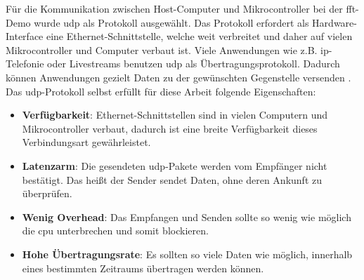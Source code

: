\documentclass[../EDF Master Thesis.tex]{subfiles}
\begin{document}
    Für die Kommunikation zwischen Host-Computer und Mikrocontroller bei der \ac{fft}-Demo wurde \ac{udp} als Protokoll ausgewählt.
    Das Protokoll erfordert als Hardware-Interface eine Ethernet-Schnittstelle, welche weit verbreitet und daher auf vielen Mikrocontroller und Computer verbaut ist.
    Viele Anwendungen wie z.B. \ac{ip}-Telefonie oder Livestreams benutzen \ac{udp} als Übertragungsprotokoll.
    Dadurch können Anwendungen gezielt Daten zu der gewünschten Gegenstelle versenden \parencite{elektronik_kompendium}.
    Das \ac{udp}-Protokoll selbst erfüllt für diese Arbeit folgende Eigenschaften:
    \begin{itemize}
        \item \textbf{Verfügbarkeit}: Ethernet-Schnittstellen sind in vielen Computern und Mikrocontroller verbaut, dadurch ist eine breite Verfügbarkeit dieses Verbindungsart gewährleistet.
        \item \textbf{Latenzarm}: Die gesendeten \ac{udp}-Pakete werden vom Empfänger nicht bestätigt. Das heißt der Sender sendet Daten, ohne deren Ankunft zu überprüfen.
        \item \textbf{Wenig Overhead}: Das Empfangen und Senden sollte so wenig wie möglich die \ac{cpu} unterbrechen und somit blockieren.
        \item \textbf{Hohe Übertragungsrate}: Es sollten so viele Daten wie möglich, innerhalb eines bestimmten Zeitraums übertragen werden können.
    \end{itemize}
\end{document}

